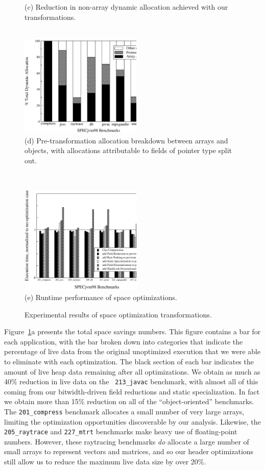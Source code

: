 \documentclass[oribibl]{llncs}
\begin{document}
\begin{figure}
\begin{center}
{(c) Reduction in non-array dynamic allocation achieved with
    our transformations.
\\~}%
\parbox[b]{6cm}{\centering%
\includegraphics[width=5.8cm,clip=true]{Figures/sas-objarrptr.eps}\\
(d) Pre-transformation allocation breakdown between arrays and objects,
with allocations attributable to fields of pointer type split out.}%
\\[.3cm]
\parbox[b]{6cm}{\centering%
\includegraphics[width=5.8cm,clip=true]{Figures/oopsla-speed.eps}\\
(e) Runtime performance of space optimizations.}%
\end{center}
\caption{Experimental results of space optimization transformations.}
\label{fig:results}
\end{figure}
%
Figure~\ref{fig:results}a presents the total space savings numbers. This
figure contains a bar for each application, with the bar broken
down into categories that indicate the percentage of live data from 
the original unoptimized execution that we were able to eliminate
with each optimization. The black section of each bar indicates the
amount of live heap data remaining after all optimizations. 
We obtain as much as 40\% reduction in live data on the {\tt
  213\_javac} benchmark, with almost all of this coming from our
bitwidth-driven field reductions and static specialization.  In fact
we obtain more than 15\% reduction on all of the ``object-oriented''
benchmarks.  The {\tt 201\_compress} benchmark allocates a small
number of very large arrays, limiting the optimization opportunities
discoverable by our analysis.  Likewise, the {\tt 205\_raytrace} and
{\tt 227\_mtrt} benchmarks make heavy use of floating-point numbers.
However, these raytracing benchmarks {\it do} allocate a large number
of small arrays to represent vectors and matrices, and so our header
optimizations still allow us to reduce the maximum live data size by
over 20\%.
\end{document}
